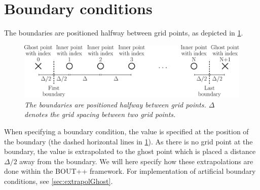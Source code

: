 \section{Boundary conditions}
%
The boundaries are positioned halfway between grid points, as depicted in \cref{fig:flatBC}.
%
\begin{figure}[htb]
    \centering
    \includegraphics[width=1.0\textwidth]{fig/flatGrid}
    \caption{\textit{
            The boundaries are positioned halfway between grid points.
            $\Delta$ denotes the grid spacing between two grid points.
        }}
    \label{fig:flatBC}
\end{figure}
%

\noindent
When specifying a boundary condition, the value is specified at the position of the boundary (the dashed horizontal lines in \cref{fig:flatBC}).
As there is no grid point at the boundary, the value is extrapolated to the ghost point which is placed a distance $\Delta/2$ away from the boundary.
We will here specify how these extrapolations are done within the BOUT++ framework.
For implementation of artificial boundary conditions, see \cref{sec:extrapolGhost}.


